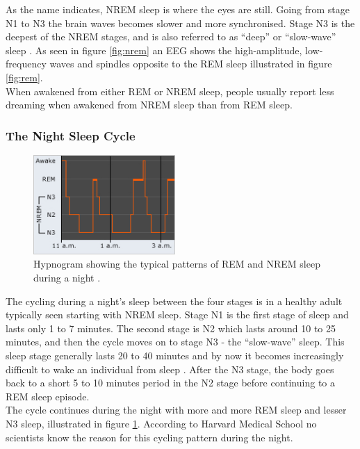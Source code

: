 \documentclass[12pt]{article} %
\begin{document}
As the name indicates, NREM sleep is where the eyes are still. Going from stage N1 to N3 the brain waves becomes slower and more synchronised. Stage N3 is the deepest of the NREM stages, and is also referred to as ``deep'' or ``slow-wave'' sleep \cite{harvard}. As seen in figure \ref{fig:nrem} an EEG shows the high-amplitude, low-frequency waves and spindles opposite to the REM sleep illustrated in figure \ref{fig:rem}. \\

When awakened from either REM or NREM sleep, people usually report less dreaming when awakened from NREM sleep than from REM sleep. 

\newpage
\subsubsection{The Night Sleep Cycle}
\begin{figure}
  \begin{center}
    \includegraphics[width=0.48\textwidth]{hyp}
  \end{center}
  \caption{Hypnogram showing the typical patterns of REM and NREM sleep during a night \cite{harvard}.}
  \label{fig:hyp}
\end{figure}

The cycling during a night's sleep between the four stages is in a healthy adult typically seen starting with NREM sleep. Stage N1 is the first stage of sleep and lasts only 1 to 7 minutes. The second stage is N2 which lasts around 10 to 25 minutes, and then the cycle moves on to stage N3 - the ``slow-wave'' sleep. This sleep stage generally lasts 20 to 40 minutes and by now it becomes increasingly difficult to wake an individual from sleep \cite{harvard}. After the N3 stage, the body goes back to a short 5 to 10 minutes period in the N2 stage before continuing to a REM sleep episode. \\

The cycle continues during the night with more and more REM sleep and lesser N3 sleep, illustrated in figure \ref{fig:hyp}. According to Harvard Medical School \cite{harvard} no scientists know the reason for this cycling pattern during the night. 
\end{document}
